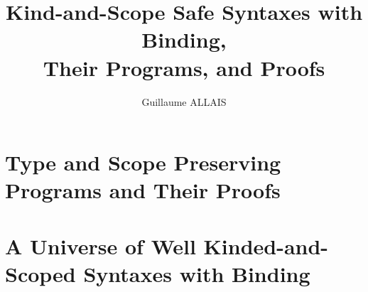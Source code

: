 \documentclass{memoir}
\title{Kind-and-Scope Safe Syntaxes with Binding, \\ Their Programs, and Proofs}
\author{Guillaume ALLAIS}
\begin{document}
\maketitle{}

\part{Type and Scope Preserving Programs and Their Proofs}
\label{type-scope-semantics}


\part{A Universe of Well Kinded-and-Scoped Syntaxes with Binding}
\label{a-universe}



\end{document}
